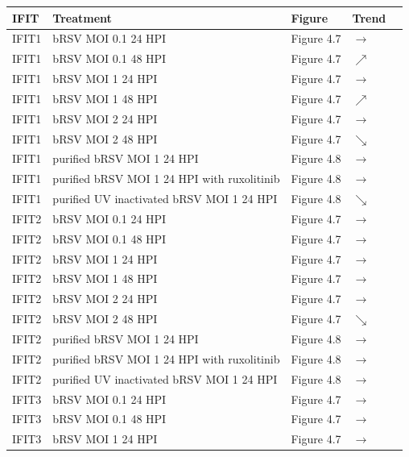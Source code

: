 \begin{table}
    \centering
    \begin{tabular}{lllll}
    \hline
	\textbf{IFIT} & \textbf{Treatment} & \textbf{Figure} & \textbf{Trend} \\ \hline
        IFIT1 & bRSV MOI 0.1 24 HPI & Figure 4.7 & \(\rightarrow\) \\ \hline
        IFIT1 & bRSV MOI 0.1 48 HPI & Figure 4.7 & \(\nearrow\) \\ 
        IFIT1 & bRSV MOI 1 24 HPI & Figure 4.7 & \(\rightarrow\) \\ 
        IFIT1 & bRSV MOI 1 48 HPI & Figure 4.7 & \(\nearrow\) \\ 
        IFIT1 & bRSV MOI 2 24 HPI & Figure 4.7 & \(\rightarrow\) \\ 
        IFIT1 & bRSV MOI 2 48 HPI & Figure 4.7 & \(\searrow\) \\ 
        IFIT1 & purified bRSV MOI 1 24 HPI & Figure 4.8 & \(\rightarrow\) \\ 
        IFIT1 & purified bRSV MOI 1 24 HPI with ruxolitinib & Figure 4.8 & \(\rightarrow\) \\ 
        IFIT1 & purified UV inactivated bRSV MOI 1 24 HPI & Figure 4.8 & \(\searrow\) \\ 
        IFIT2 & bRSV MOI 0.1 24 HPI & Figure 4.7 & \(\rightarrow\) \\ 
        IFIT2 & bRSV MOI 0.1 48 HPI & Figure 4.7 & \(\rightarrow\) \\ 
        IFIT2 & bRSV MOI 1 24 HPI & Figure 4.7 & \(\rightarrow\) \\ 
        IFIT2 & bRSV MOI 1 48 HPI & Figure 4.7 & \(\rightarrow\) \\ 
        IFIT2 & bRSV MOI 2 24 HPI & Figure 4.7 & \(\rightarrow\) \\ 
        IFIT2 & bRSV MOI 2 48 HPI & Figure 4.7 & \(\searrow\) \\ 
        IFIT2 & purified bRSV MOI 1 24 HPI & Figure 4.8 & \(\rightarrow\) \\ 
        IFIT2 & purified bRSV MOI 1 24 HPI with ruxolitinib & Figure 4.8 & \(\rightarrow\) \\ 
        IFIT2 & purified UV inactivated bRSV MOI 1 24 HPI & Figure 4.8 & \(\rightarrow\) \\ 
        IFIT3 & bRSV MOI 0.1 24 HPI & Figure 4.7 & \(\rightarrow\) \\ 
        IFIT3 & bRSV MOI 0.1 48 HPI & Figure 4.7 & \(\rightarrow\) \\ 
        IFIT3 & bRSV MOI 1 24 HPI & Figure 4.7 & \(\rightarrow\) \\ 

\end{tabular}
\end{table}
